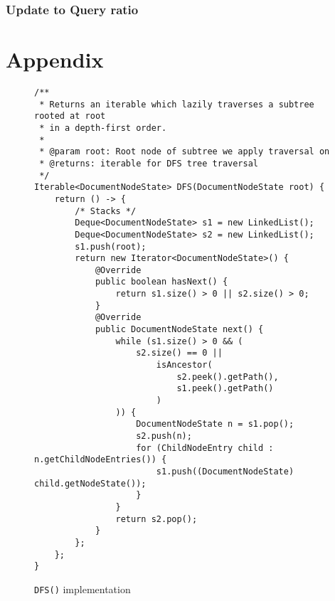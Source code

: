\documentclass[abstracton,12pt]{scrartcl}
\theoremstyle{definition}
\begin{document}
\subsubsection{Update to Query ratio}






\section{Appendix}

\begin{figure}
  \centering
\begin{verbatim}
/**
 * Returns an iterable which lazily traverses a subtree rooted at root
 * in a depth-first order.
 *
 * @param root: Root node of subtree we apply traversal on
 * @returns: iterable for DFS tree traversal
 */
Iterable<DocumentNodeState> DFS(DocumentNodeState root) {
    return () -> {
        /* Stacks */
        Deque<DocumentNodeState> s1 = new LinkedList();
        Deque<DocumentNodeState> s2 = new LinkedList();
        s1.push(root);
        return new Iterator<DocumentNodeState>() {
            @Override
            public boolean hasNext() {
                return s1.size() > 0 || s2.size() > 0;
            }
            @Override
            public DocumentNodeState next() {
                while (s1.size() > 0 && (
                    s2.size() == 0 ||
                        isAncestor(
                            s2.peek().getPath(),
                            s1.peek().getPath()
                        )
                )) {
                    DocumentNodeState n = s1.pop();
                    s2.push(n);
                    for (ChildNodeEntry child : n.getChildNodeEntries()) {
                        s1.push((DocumentNodeState) child.getNodeState());
                    }
                }
                return s2.pop();
            }          
        };
    };
}
\end{verbatim}
  \caption{\texttt{DFS()} implementation}
  \label{fig:java_dfs}
\end{figure}
\end{document}
